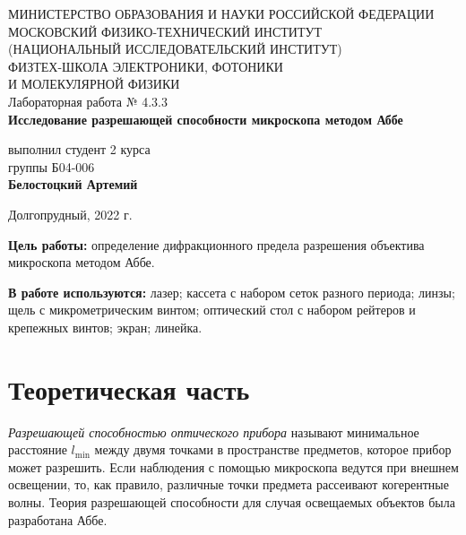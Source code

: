 \documentclass[a4paper,12pt]{article}
\begin{document}
 

\begin{titlepage}
	\begin{center}
		\large 	МИНИСТЕРСТВО ОБРАЗОВАНИЯ И НАУКИ РОССИЙСКОЙ ФЕДЕРАЦИИ\\
				МОСКОВСКИЙ ФИЗИКО-ТЕХНИЧЕСКИЙ ИНСТИТУТ \\
				(НАЦИОНАЛЬНЫЙ ИССЛЕДОВАТЕЛЬСКИЙ ИНСТИТУТ)\\ 
				ФИЗТЕХ-ШКОЛА ЭЛЕКТРОНИКИ, ФОТОНИКИ \\
				И МОЛЕКУЛЯРНОЙ ФИЗИКИ \\
		
		
		\vspace{7.0 cm}
		Лабораторная работа № 4.3.3 \\ 
		\LARGE \textbf{Исследование разрешающей способности микроскопа методом Аббе}
	\end{center}
	\vspace{3 cm} \large
	
	\begin{flushright}
		выполнил студент 2 курса \\
		{группы Б04-006}\\
		\textbf{Белостоцкий Артемий}\\
	\end{flushright}
	
	\vfill

	\begin{center}
	Долгопрудный, 2022 г.
	\end{center}
\end{titlepage}                                                                      


\textbf{Цель работы:} определение дифракционного предела разрешения объектива микроскопа методом Аббе.

\textbf{В работе используются:} лазер; кассета с набором сеток разного периода; линзы; щель с микрометрическим винтом; оптический стол с набором рейтеров и крепежных винтов; экран; линейка. 


\section*{Теоретическая часть}
	\textit{Разрешающей способностью оптического прибора} называют минимальное расстояние $l_{\text{min}}$ между двумя точками в пространстве предметов, которое прибор может разрешить. Если наблюдения с помощью микроскопа ведутся при внешнем освещении, то, как правило, различные точки предмета рассеивают когерентные волны. Теория разрешающей способности для случая освещаемых объектов была разработана Аббе.
\end{document}
